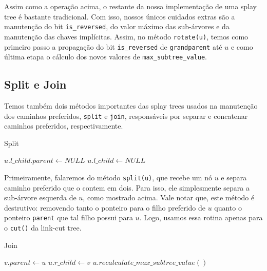 Assim como a operação acima, o restante da nossa implementação de uma splay tree é bastante tradicional. Com isso, nossos únicos cuidados extras são a manutenção do bit \texttt{is\_reversed}, do valor máximo das sub-árvores e da manutenção das chaves implícitas. Assim, no método \texttt{rotate(u)}, temos como primeiro passo a propagação do bit \texttt{is\_reversed} de \texttt{grandparent} até $u$ e como última etapa o cálculo dos novos valores de \texttt{max\_subtree\_value}.

\subsection{Split e Join}
\label{subsection:lct-splay-split-join}

Temos também dois métodos importantes das splay trees usados na manutenção dos caminhos preferidos, \texttt{split} e \texttt{join}, responsáveis por separar e concatenar caminhos preferidos, respectivamente.

\begin{algorithm}[h!]
    \caption{Split}\label{splay:split}
    \begin{algorithmic}
        \State $u.l\_child.parent \gets NULL$
        \EndIf
        \State $u.l\_child \gets NULL$
        \EndFunction
    \end{algorithmic}
\end{algorithm}

Primeiramente, falaremos do método \texttt{split(u)}, que recebe um nó $u$ e separa caminho preferido que o contem em dois. Para isso, ele simplesmente separa a sub-árvore esquerda de $u$, como mostrado acima. Vale notar que, este método é destrutivo: removendo tanto o ponteiro para o filho preferido de $u$ quanto o ponteiro \texttt{parent} que tal filho possui para $u$. Logo, usamos essa rotina apenas para o \texttt{cut()} da link-cut tree.

\begin{algorithm}[h!]
    \caption{Join}\label{splay:join}
    \begin{algorithmic}
        \State $v.parent \gets u$
        \EndIf
        \State $u.r\_child \gets v$
        \State {}
        \State $u.recalculate\_max\_subtree\_value()$
        \EndFunction
    \end{algorithmic}
\end{algorithm}

